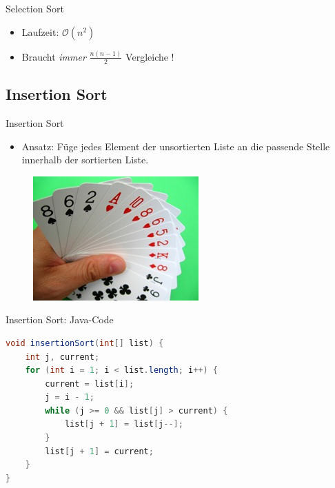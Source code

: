 \documentclass[18pt]{beamer}
\begin{document}
\begin{frame}{Selection Sort}
    \begin{itemize}
        \item Laufzeit: $\mathcal{O}(n^2)$
        \item Braucht \textit{immer} $\frac{n(n-1)}{2}$ Vergleiche !
    \end{itemize}
\end{frame}

\subsection{Insertion Sort}

\begin{frame}{Insertion Sort}
    \begin{itemize}
        \item Ansatz: Füge jedes Element der unsortierten Liste an die passende Stelle innerhalb der sortierten Liste.
    \end{itemize}
    \vspace{.1in}
    \begin{figure}
        \includegraphics[scale=0.8]{img/InsertionSort.jpg}
    \end{figure}
\end{frame}

\begin{frame}[fragile]{Insertion Sort: Java-Code}
    \begin{exampleblock}{}
        \begin{lstlisting}[language=Java,basicstyle=\scriptsize]
void insertionSort(int[] list) {
    int j, current;
    for (int i = 1; i < list.length; i++) {
        current = list[i];
        j = i - 1;
        while (j >= 0 && list[j] > current) {
            list[j + 1] = list[j--];
        }
        list[j + 1] = current;
    }
}
        \end{lstlisting}
    \end{exampleblock}
\end{frame}
\end{document}
